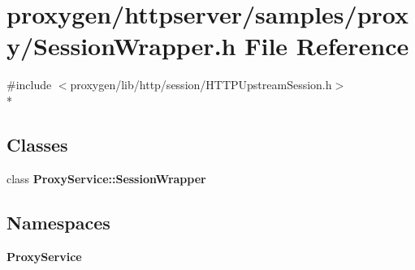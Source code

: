 \section{proxygen/httpserver/samples/proxy/\+Session\+Wrapper.h File Reference}
\label{SessionWrapper_8h}
{\ttfamily \#include $<$proxygen/lib/http/session/\+H\+T\+T\+P\+Upstream\+Session.\+h$>$}\\*
\subsection*{Classes}
\begin{DoxyCompactItemize}
\item 
class {\bf Proxy\+Service\+::\+Session\+Wrapper}
\end{DoxyCompactItemize}
\subsection*{Namespaces}
\begin{DoxyCompactItemize}
\item 
 {\bf Proxy\+Service}
\end{DoxyCompactItemize}
